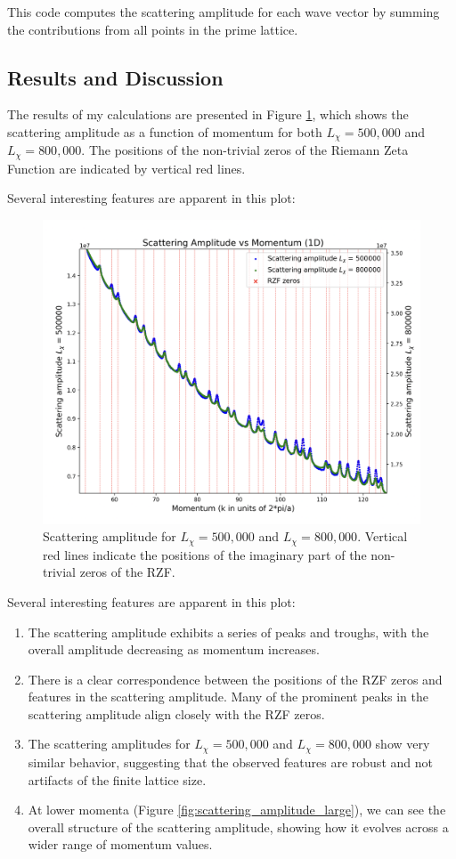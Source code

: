 \documentclass[11pt, oneside]{article}
\begin{document}
This code computes the scattering amplitude for each wave vector by summing the contributions from all points in the prime lattice.

\subsection{Results and Discussion}

The results of my calculations are presented in Figure \ref{fig:scattering_amplitude}, which shows the scattering amplitude as a function of momentum for both $L_\chi = 500,000$ and $L_\chi = 800,000$. The positions of the non-trivial zeros of the Riemann Zeta Function are indicated by vertical red lines.

Several interesting features are apparent in this plot:

\begin{figure}[htbp]
\begin{center}
    \includegraphics[width=0.8\linewidth]{../images/zoomed_scattering.png}
\caption{Scattering amplitude for $L_\chi = 500,000$ and $L_\chi = 800,000$. Vertical red lines indicate the positions of the imaginary part of the non-trivial zeros of the RZF.}
\label{fig:scattering_amplitude}
\end{center}
\end{figure}

Several interesting features are apparent in this plot:

\begin{enumerate}
    \item The scattering amplitude exhibits a series of peaks and troughs, with the overall amplitude decreasing as momentum increases.
    \item There is a clear correspondence between the positions of the RZF zeros and features in the scattering amplitude. Many of the prominent peaks in the scattering amplitude align closely with the RZF zeros.
    \item The scattering amplitudes for $L_\chi = 500,000$ and $L_\chi = 800,000$ show very similar behavior, suggesting that the observed features are robust and not artifacts of the finite lattice size.
    \item At lower momenta (Figure \ref{fig:scattering_amplitude_large}), we can see the overall structure of the scattering amplitude, showing how it evolves across a wider range of momentum values.
\end{enumerate}
\end{document}
